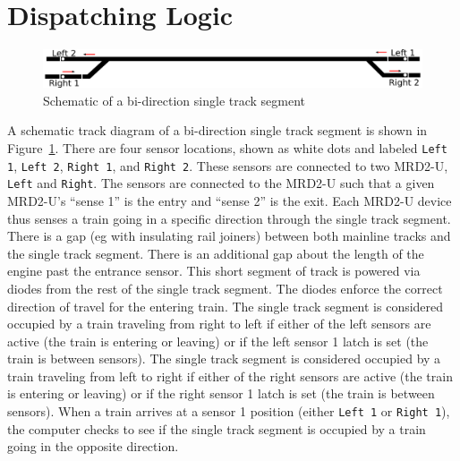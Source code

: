 \section{Dispatching Logic}

\begin{figure}[hbpt]
\begin{centering}
\includegraphics[width=5in]{singletrack-ink1.png}
\caption{Schematic of a bi-direction single track segment}
\label{fig:AutoDispatcher:singletrack-ink1}
\end{centering}
\end{figure}
A schematic track diagram of a bi-direction single track segment is
shown in Figure~\ref{fig:AutoDispatcher:singletrack-ink1}. There are
four sensor locations, shown as white dots and labeled \texttt{Left 1},
\texttt{Left 2}, \texttt{Right 1}, and \texttt{Right 2}.  These sensors
are connected to two MRD2-U, \texttt{Left} and \texttt{Right}. The
sensors are connected to the MRD2-U such that a given MRD2-U's ``sense
1'' is the entry and ``sense 2'' is the exit.  Each MRD2-U device thus
senses a train going in a specific direction through the single track
segment. There is a gap (eg with insulating rail joiners) between both
mainline tracks and the single track segment.  There is an additional
gap about the length of the engine past the entrance sensor.  This short
segment of track is powered via diodes from the rest of the single track
segment. The diodes enforce the correct direction of travel for the
entering train. The single track segment is considered occupied by a train
traveling from right to left if either of the left sensors are active
(the train is entering or leaving) or if the left sensor 1 latch is set
(the train is between sensors).  The  single track segment is
considered occupied by a train traveling from left to right if either
of the right sensors are active (the train is entering or leaving) or
if the right sensor 1 latch is set (the train is between sensors). 
When a train arrives at a sensor 1 position (either \texttt{Left 1} or
\texttt{Right 1}), the computer checks to see if the single track
segment is occupied by a train going in the opposite direction.



